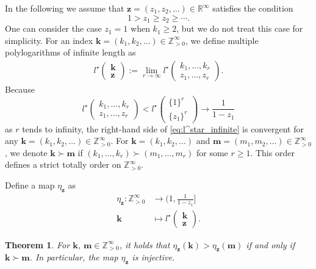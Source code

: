 \documentclass[12pt,a4paper]{article}
\newtheorem{thm}[defi]{Theorem}
\theoremstyle{remark}
\begin{document}
In the following
we assume that
$\boldsymbol{z}=(z_1, z_2, \ldots ) \in \mathbb{R}^{\infty}$ satisfies the condition
\[ 1> z_1 \ge z_2 \ge \cdots .\]
One can consider the case $z_1=1$ when $k_1\ge 2$,
but we do not treat this case for simplicity.
For 
an index 
$\boldsymbol{k}=(k_1, k_2, \ldots ) \in
\mathbb{Z}_{>0}^{\infty}$,
we define multiple polylogarithms of infinite length as
\begin{align}\label{eq:l^star_infinite}
 l^{\star}\begin{pmatrix}
\boldsymbol{k} \\
\boldsymbol{z} 
\end{pmatrix}
:=
\lim_{r\to \infty} 
 l^{\star}\begin{pmatrix}
k_1,\ldots, k_r \\
z_1,\ldots, z_r 
\end{pmatrix}.
\end{align}
Because
\[  l^{\star}\begin{pmatrix}
k_1,\ldots, k_r \\
z_1,\ldots, z_r 
\end{pmatrix}
< l^{\star}\begin{pmatrix}
\{1\}^r \\
\{z_1\}^r 
\end{pmatrix}
\to \dfrac{1}{1-z_1}\]
as $r$ tends to infinity,
the right-hand side of 
\eqref{eq:l^star_infinite} is convergent for 
any $\boldsymbol{k}=(k_1, k_2, \ldots )\in \mathbb{Z}_{>0}^{\infty}$.
For 
$\boldsymbol{k}=(k_1,k_2,\ldots)$ and
$\boldsymbol{m}=(m_1,m_2,\ldots)
\in \mathbb{Z}_{>0}^{\infty}$,
we denote 
$\boldsymbol{k}\succ \boldsymbol{m}$
if 
$(k_1,\ldots ,k_r) \succ
(m_1,\ldots ,m_r)$ for some $r\ge 1$.
This order defines 
a strict totally order on $\mathbb{Z}_{>0}^{\infty}$.

Define a map $\eta_{\boldsymbol{z}}$ as
\begin{align*}
    \eta_{\boldsymbol{z}} : \mathbb{Z}_{>0}^{\infty} &\longrightarrow 
    (1, \tfrac{1}{1-z_1}] \\
    \boldsymbol{k} &\longmapsto 
l^{\star}\begin{pmatrix}
\boldsymbol{k}\\
\boldsymbol{z}
\end{pmatrix}.
    \end{align*}

\begin{thm}
For 
$\boldsymbol{k}$,
$\boldsymbol{m}\in \mathbb{Z}_{>0}^{\infty}$,
it holds that $\eta_{\boldsymbol{z}}(\boldsymbol{k}) > \eta_{\boldsymbol{z}}(\boldsymbol{m})$
if and only if $\boldsymbol{k} \succ \boldsymbol{m}$.
In particular, 
the map $\eta_{\boldsymbol{z}}$ is injective.
\end{thm}
\end{document}

